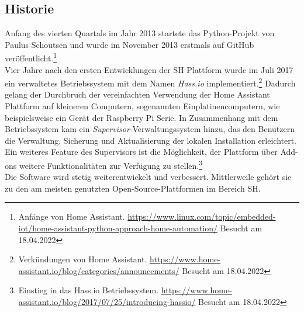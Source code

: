     \subsection*{Historie}
    \label{sec:historyHOAS}
        Anfang des vierten Quartals im Jahr 2013 startete das Python-Projekt von Paulus Schoutsen und wurde im November 2013 erstmals auf GitHub 
        veröffentlicht.\footnote{Anfänge von Home Assistant. \url{https://www.linux.com/topic/embedded-iot/home-assistant-python-approach-home-automation/} Besucht am 18.04.2022}
        \\
        \linebreak
        Vier Jahre nach den ersten Entwicklungen der \acl{SH} Plattform wurde im Juli 2017 ein verwaltetes Betriebssystem mit dem Namen 
        \textit{Hass.io} implementiert.\footnote{Verkündungen von Home Assistant. \url{https://www.home-assistant.io/blog/categories/announcements/} Besucht am 18.04.2022} 
        Dadurch gelang der Durchbruch der vereinfachten Verwendung der Home Assistant Plattform auf kleineren Computern, sogenannten 
        Einplatinencomputern, wie beispielsweise ein Gerät der Raspberry Pi Serie. In Zusammenhang mit dem Betriebssystem kam ein 
        \textit{Supervisor}-Verwaltungssystem hinzu, das den Benutzern die Verwaltung, Sicherung und Aktualisierung der lokalen Installation 
        erleichtert. Ein weiteres Feature des Supervisors ist die Möglichkeit, der Plattform über Add-ons weitere Funktionalitäten zur Verfügung zu 
        stellen.\footnote{Einstieg in das Hass.io Betriebssystem. \url{https://www.home-assistant.io/blog/2017/07/25/introducing-hassio/} Besucht am 18.04.2022}
        \\
        \linebreak
        Die Software wird stetig weiterentwickelt und verbessert. Mittlerweile gehört sie zu den am meisten genutzten Open-Source-Plattformen 
        im Bereich \acl{SH}.

